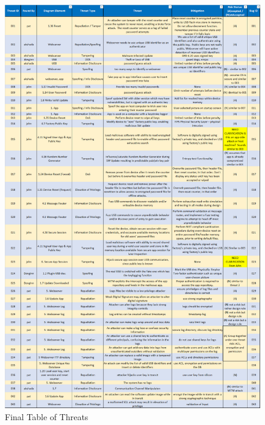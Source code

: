 \begin{figure}
\centering
  \includegraphics[width=\linewidth]{threat_list_final}
  \caption{Final Table of Threats}
  \label{fig:threatlist}
\end{figure}